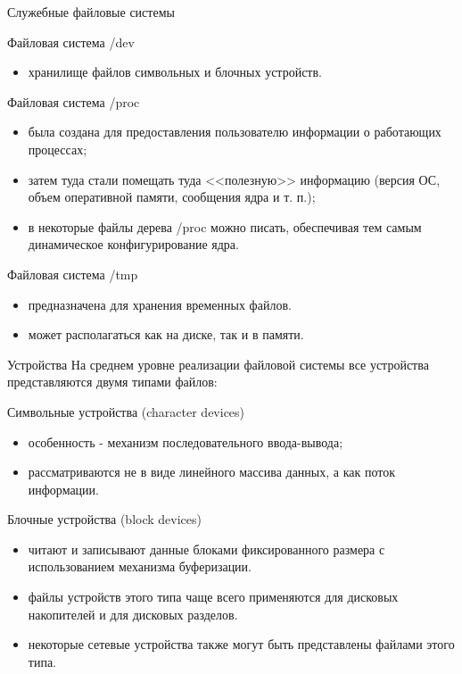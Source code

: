 \documentclass{beamer}
\begin{document}
\begin{frame}[fragile]{Служебные файловые системы}
\begin{block}{Файловая система /dev}
\begin{itemize}
\item хранилище файлов символьных и блочных устройств.
\end{itemize}
\end{block}
\begin{block}{Файловая система /proc}
\begin{itemize}
\item  была создана для предоставления пользователю информации о работающих процессах; 
\item  затем туда стали помещать туда <<полезную>> информацию (версия ОС, объем оперативной памяти, сообщения ядра и т. п.);
\item  в некоторые файлы дерева /proc можно писать, обеспечивая тем самым динамическое конфигурирование ядра.
\end{itemize}
\end{block}
\begin{block}{Файловая система /tmp}
\begin{itemize}
\item предназначена для хранения временных файлов. 
\item может располагаться как на диске, так и в памяти.
\end{itemize}
\end{block}
\end{frame}

\begin{frame}[fragile]{Устройства}
На среднем уровне реализации файловой системы все устройства представляются двумя типами файлов:
\begin{block}{Символьные устройства (character devices)}
\begin{itemize}
\item особенность - механизм последовательного ввода-вывода;
\item рассматриваются не в виде линейного массива данных, а как поток информации.
\end{itemize}
\end{block}
\begin{block}{Блочные устройства (block devices)}
\begin{itemize}
\item читают и записывают данные блоками фиксированного размера с использованием механизма буферизации. 
\item файлы устройств этого типа чаще всего применяются для дисковых накопителей и для дисковых разделов. 
\item некоторые сетевые устройства также могут быть представлены файлами этого типа.
\end{itemize}
\end{block}
\end{frame}
\end{document}
